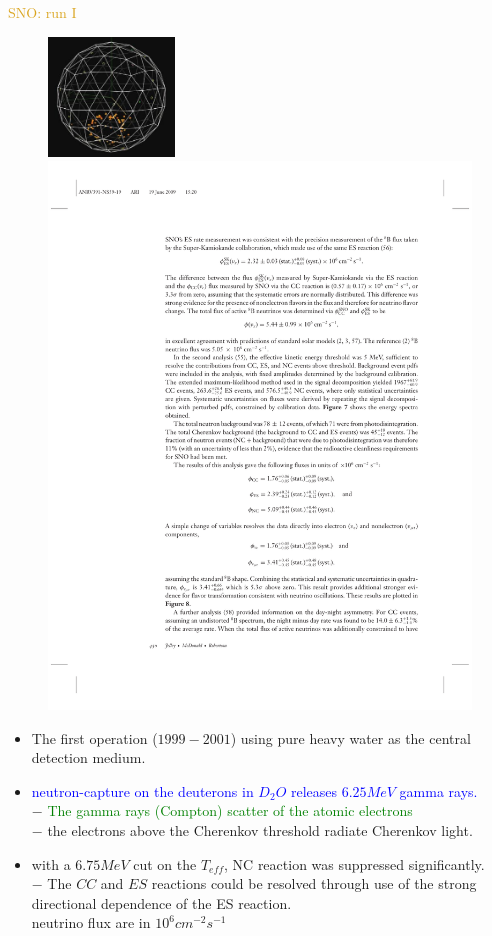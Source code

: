 \documentclass[11pt]{beamer} %
\renewcommand{\(}{\begin{columns}}
\renewcommand{\)}{\end{columns}}
\newcommand{\<}[1]{\begin{column}{#1}}
\renewcommand{\>}{\end{column}}
\newcommand{\itt}{\begin{itemize}}
\newcommand{\tti}{\end{itemize}}
\begin{document}
\begin{frame}{\textcolor{Goldenrod}{SNO: run I}}
\begin{overlayarea}{\textwidth}{\textheight}
\begin{figure}[h]
      \includegraphics[height=0.15\textwidth,width=0.3\textwidth]{./Images/SNO08}
      \includegraphics{./Images/SNO10}
    \end{figure}
    
    \itt[<only@+>]
  \item The first operation ($1999-2001$) using pure heavy water as
    the central detection medium.
  \item \textcolor{blue}{neutron-capture on the deuterons in $D_2 O $ releases $6.25 MeV$
      gamma rays.}\\
    $-$ \textcolor{green}{The gamma rays (Compton) scatter of the atomic electrons}\\
    $-$ \alert{the electrons above the Cherenkov threshold radiate Cherenkov light}.
  \item {\small with a $6.75 MeV$ cut on the $T_{eff}$, NC
      reaction was suppressed significantly.\\
      $-$ The $CC$ and $ES$ reactions could be resolved through use of the
      strong directional dependence of the ES reaction.\\
      \alert{neutrino flux
        are in $10^6 cm^{-2}s^{-1}$}}
    \tti
  \end{overlayarea}    
\end{frame}
\end{document}
